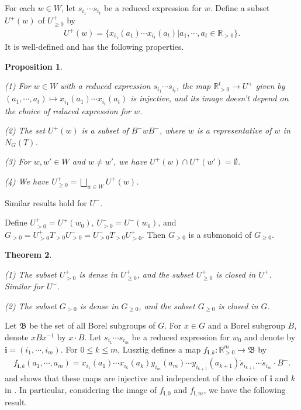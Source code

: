 \documentclass[12pt]{amsart}
\newtheorem{theorem}{Theorem}[section]
\newtheorem{proposition}[theorem]{Proposition}
\begin{document}
For each $w\in W$, let $s_{i_1}\cdots s_{i_t}$ be a reduced expression for $w$. Define a subset $U^+(w)$ of $U^+_{\geq 0}$ by 
\begin{align*}
    U^+(w)=\{x_{i_1}(a_1)\cdots x_{i_t}(a_t)| a_1,\cdots,a_t \in \mathbb{R}_{>0}\}.
\end{align*}
It is well-defined and has the following properties.

\begin{proposition}\label{uw}
    \cite[Proposition 2.7, Corollary 2.8]{TR1}
    
    (1) For $w\in W$ with a reduced expression $s_{i_1}\cdots s_{i_t}$, the map $\mathbb{R}^t_{>0}\rightarrow U^+$ given by $(a_1,\cdots, a_t)\mapsto x_{i_1}(a_1)\cdots x_{i_t}(a_t)$ is injective, and its image doesn't depend on the choice of reduced expression for $w$.

    (2) The set $U^+(w)$ is a subset of $B^- \dot{w} B^-$, where $\dot{w}$ is a representative of $w$ in $N_G(T)$.

    (3) For $w,w'\in W$ and $w\neq w'$, we have $U^+(w) \cap U^+(w')=\emptyset$.

    (4) We have $U^+_{\geq 0}=\bigsqcup\limits_{w\in W}U^+(w)$.
\end{proposition}



Similar results hold for $U^-$.

Define $U^+_{>0}=U^+(w_0)$, $U^-_{>0}=U^-(w_0)$, and $G_{>0}=U^+_{>0} T_{>0} U^-_{>0}=U^-_{>0} T_{>0} U^+_{>0}$.
Then $G_{>0}$ is a submonoid of $G_{\geq 0}$.

\begin{theorem}\label{dense}
    \cite[Proposition 4.2, Theorem 4.3, Remark 4.4]{TR1}

    (1) The subset $U^+_{>0}$ is dense in $U^+_{\geq 0}$, and the subset $U^+_{\geq 0}$ is closed in $U^+$. Similar for $U^-$.

    (2) The subset $G_{>0}$ is dense in $G_{\geq 0}$, and the subset $G_{\geq 0}$ is closed in $G$. 
\end{theorem}

Let $\mathfrak{B}$ be the set of all Borel subgroups of $G$.
For $x\in G$ and a Borel subgroup $B$, denote $xBx^{-1}$ by $x\cdot B$.
Let $s_{i_1}\cdots s_{i_m}$ be a reduced expression for $w_0$ and denote by $\mathbf{i}=(i_1,\cdots,i_m)$.
For $0\leq k\leq m$, Lusztig defines a map $f_{\mathbf{i},k}:\mathbb{R}_{>0}^m\rightarrow \mathfrak{B}$ by 
    \begin{align*}
        f_{\mathbf{i},k}(a_1,\cdots,a_m)=x_{i_1}(a_1)\cdots x_{i_k}(a_k) y_{i_m}(a_m)\cdots y_{i_{k+1}}(a_{k+1}) \dot{s}_{i_{k+1}}\cdots \dot{s}_{i_m} \cdot B^-.
    \end{align*}
and shows that these maps are injective and independent of the choice of $\mathbf{i}$ and $k$ in \cite[3.1, Proposition 3.2]{TC}.
In particular, considering the image of $f_{\mathbf{i},0}$ and $f_{\mathbf{i},m}$, we have the following result.
\end{document}
